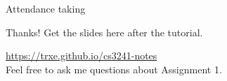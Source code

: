 \documentclass{beamer}
\begin{document}
\begin{frame}
    \AlegreyaExtraBold \LARGE
    Attendance taking
\end{frame}

\ThankYou
\begin{frame}
    Thanks! Get the slides here after the tutorial.\\
    \vspace{2em}
    \scalebox{3}{\faGithub}\par\bigskip
    \url{https://trxe.github.io/cs3241-notes}\\
    \vspace{3em}
    {\small Feel free to ask me questions about Assignment 1.  }
\end{frame}
\end{document}
